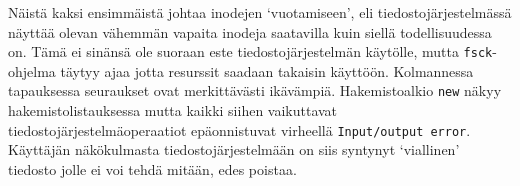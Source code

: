 %
Näistä kaksi ensimmäistä johtaa inodejen `vuotamiseen',
eli tiedostojärjestelmässä näyttää olevan vähemmän vapaita inodeja saatavilla kuin siellä todellisuudessa on.
Tämä ei sinänsä ole suoraan este tiedostojärjestelmän käytölle,
mutta \texttt{fsck}-ohjelma täytyy ajaa jotta resurssit saadaan takaisin käyttöön.
Kolmannessa tapauksessa seuraukset ovat merkittävästi ikävämpiä.
Hakemistoalkio \texttt{new} näkyy hakemistolistauksessa mutta kaikki siihen vaikuttavat tiedostojärjestelmäoperaatiot epäonnistuvat virheellä \texttt{Input/output error}.
Käyttäjän näkökulmasta tiedostojärjestelmään on siis syntynyt `viallinen' tiedosto jolle ei voi tehdä mitään, edes poistaa.


